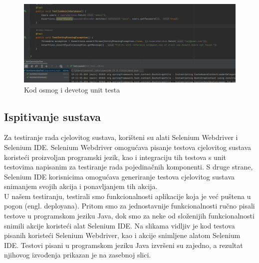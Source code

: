                 \begin{figure}[H]
				\includegraphics[]{slike/unit7.png}
				\centering
				\caption{Kod osmog i devetog unit testa}
				\label{fig:unit89}
			\end{figure}

                \eject
                

        
			
			
			
			\subsection{Ispitivanje sustava}

                Za testiranje rada cjelovitog sustava, korišteni su alati Selenium Webdriver i Selenium IDE. Selenium Webdriver omogućava pisanje testova cjelovitog sustava koristeći proizvoljan programski jezik, kao i integraciju tih testova s unit testovima napisanim za testiranje rada pojedinačnih komponenti. S druge strane, Selenium IDE korisnicima omogućava generiranje testova cjelovitog sustava snimanjem svojih akcija i ponavljanjem tih akcija. \\
                
                U našem testiranju, testirali smo funkcionalnosti aplikacije koja je već puštena u pogon (engl. deployana). Pritom smo za jednostavnije funkcionalnosti ručno pisali testove u programskom jeziku Java, dok smo za neke od složenijih funkcionalnosti snimili akcije koristeći alat Selenium IDE. Na slikama vidljiv je kod testova pisanih koristeći Selenium Webdriver, kao i akcije snimljene alatom Selenium IDE. Testovi pisani u programskom jeziku Java izvršeni su zajedno, a rezultat njihovog izvođenja prikazan je na zasebnoj slici. 

